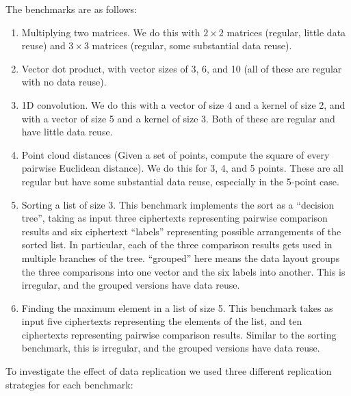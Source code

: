 The benchmarks are as follows:
\begin{enumerate}[label=\arabic*.]
    \item Multiplying two matrices. We do this with $2\times 2$ matrices (regular, little data reuse) and $3\times 3$ matrices (regular, some substantial data reuse). %
    \item Vector dot product, with vector sizes of 3, 6, and 10 (all of these are regular with no data reuse).
    \item 1D convolution. We do this with a vector of size 4 and a kernel of size 2, and with a vector of size 5 and a kernel of size 3. Both of these are regular and have little data reuse.
    \item Point cloud distances (Given a set of points, compute the square of every pairwise Euclidean distance). We do this for 3, 4, and 5 points. These are all regular but have some substantial data reuse, especially in the 5-point case.
    \item Sorting a list of size 3. This benchmark implements the sort as a ``decision tree'', taking as input three ciphertexts representing pairwise comparison results and six ciphertext ``labels'' representing possible arrangements of the sorted list. In particular, each of the three comparison results gets used in multiple branches of the tree. ``grouped'' here means the data layout groups the three comparisons into one vector and the six labels into another. This is irregular, and the grouped versions have data reuse.
    \item Finding the maximum element in a list of size 5. This benchmark takes as input five ciphertexts representing the elements of the list, and ten ciphertexts representing pairwise comparison results. Similar to the sorting benchmark, this is irregular, and the grouped versions have data reuse.
\end{enumerate}


To investigate the effect of data replication we used three different replication strategies for each benchmark: 

